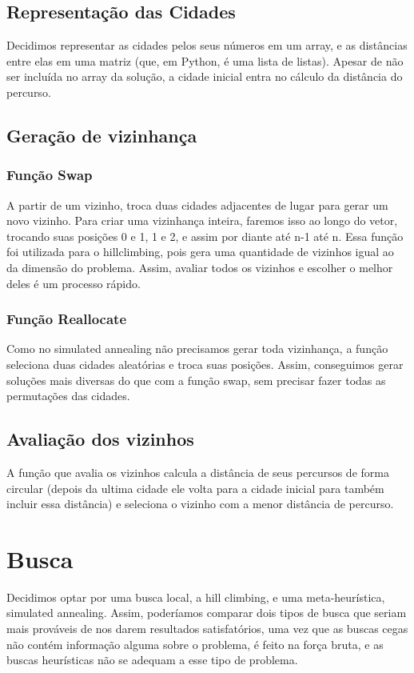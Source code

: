 \documentclass[a4paper,12 pts]{article}
\begin{document}
	\subsection{Representação das Cidades}
		Decidimos representar as cidades pelos seus números em um array, e as distâncias entre elas em uma matriz (que, em Python, é uma lista de listas). Apesar de não ser incluída no array da solução, a cidade inicial entra no cálculo da distância do percurso.
	
	\subsection{Geração de vizinhança}
		\subsubsection{Função Swap}
			A partir de um vizinho, troca duas cidades adjacentes de lugar para gerar um novo vizinho. Para criar uma vizinhança inteira, faremos isso ao longo do vetor, trocando suas posições 0 e 1, 1 e 2, e assim por diante até n-1 até n. Essa função foi utilizada para o hillclimbing, pois gera uma quantidade de vizinhos igual ao da dimensão do problema. Assim, avaliar todos os vizinhos e escolher o melhor deles é um processo rápido.

		\subsubsection{Função Reallocate} 
			Como no simulated annealing não precisamos gerar toda vizinhança, a função seleciona duas cidades aleatórias e troca suas posições. Assim, conseguimos gerar soluções mais diversas do que com a função swap, sem precisar fazer todas as permutações das cidades.
	
	\subsection{Avaliação dos vizinhos}
		A função que avalia os vizinhos calcula a distância de seus percursos de forma circular (depois da ultima cidade ele volta para a cidade inicial para também incluir essa distância) e seleciona o vizinho com a menor distância de percurso.
\newpage	
\section{Busca}
	Decidimos optar por uma busca local, a hill climbing, e uma meta-heurística, simulated annealing. Assim, poderíamos comparar dois tipos de busca que seriam mais prováveis de nos darem resultados satisfatórios, uma vez que as buscas cegas não contém informação alguma sobre o problema, é feito na força bruta, e as buscas heurísticas não se adequam a esse tipo de problema.
	
\end{document}
